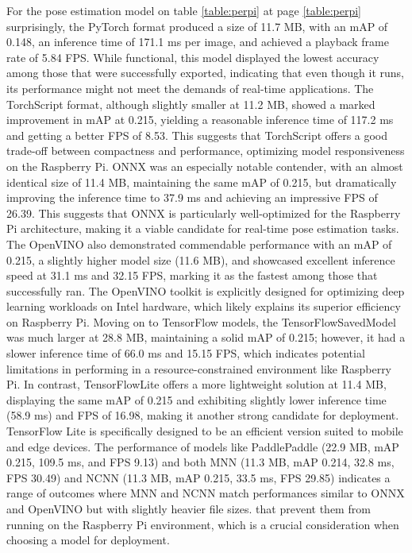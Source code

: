 \documentclass[12pt]{article}
\begin{document}
For the pose estimation model on table \ref{table:perpi} at page \ref{table:perpi} surprisingly, the PyTorch format produced a size of 11.7 MB, with an mAP of 0.148, an inference time of 171.1 ms per image, and achieved a playback frame rate of 5.84 FPS. While functional, this model displayed the lowest accuracy among those that were successfully exported, indicating that even though it runs, its performance might not meet the demands of real-time applications.
The TorchScript format, although slightly smaller at 11.2 MB, showed a marked improvement in mAP at 0.215, yielding a reasonable inference time of 117.2 ms and getting a better FPS of 8.53. This suggests that TorchScript offers a good trade-off between compactness and performance, optimizing model responsiveness on the Raspberry Pi.
ONNX was an especially notable contender, with an almost identical size of 11.4 MB, maintaining the same mAP of 0.215, but dramatically improving the inference time to 37.9 ms and achieving an impressive FPS of 26.39. This suggests that ONNX is particularly well-optimized for the Raspberry Pi architecture, making it a viable candidate for real-time pose estimation tasks.
The OpenVINO also demonstrated commendable performance with an mAP of 0.215, a slightly higher model size (11.6 MB), and showcased excellent inference speed at 31.1 ms and 32.15 FPS, marking it as the fastest among those that successfully ran. The OpenVINO toolkit is explicitly designed for optimizing deep learning workloads on Intel hardware, which likely explains its superior efficiency on Raspberry Pi.
Moving on to TensorFlow models, the TensorFlowSavedModel was much larger at 28.8 MB, maintaining a solid mAP of 0.215; however, it had a slower inference time of 66.0 ms and 15.15 FPS, which indicates potential limitations in performing in a resource-constrained environment like Raspberry Pi.
In contrast, TensorFlowLite offers a more lightweight solution at 11.4 MB, displaying the same mAP of 0.215 and exhibiting slightly lower inference time (58.9 ms) and FPS of 16.98, making it another strong candidate for deployment. TensorFlow Lite is specifically designed to be an efficient version suited to mobile and edge devices.
The performance of models like PaddlePaddle (22.9 MB, mAP 0.215, 109.5 ms, and FPS 9.13) and both MNN (11.3 MB, mAP 0.214, 32.8 ms, FPS 30.49) and NCNN (11.3 MB, mAP 0.215, 33.5 ms, FPS 29.85) indicates a range of outcomes where MNN and NCNN match performances similar to ONNX and OpenVINO but with slightly heavier file sizes.
that prevent them from running on the Raspberry Pi environment, which is a crucial consideration when choosing a model for deployment.
\end{document}
